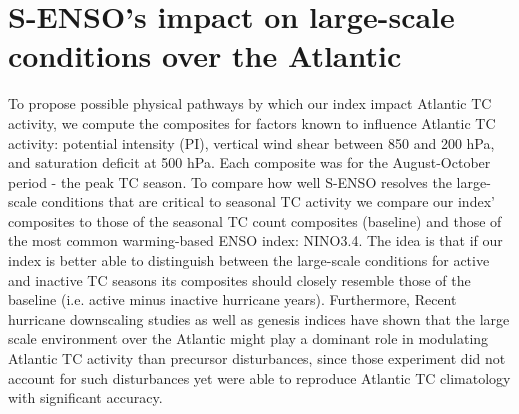 \section{S-ENSO's impact on large-scale conditions over the Atlantic}
To propose possible physical pathways by which our index impact Atlantic TC activity, we compute the composites for factors known to influence Atlantic TC activity: potential intensity (PI), vertical wind shear between 850 and 200 hPa, and saturation deficit at 500 hPa. Each composite was for the August-October period - the peak TC season. To compare how well S-ENSO resolves the large-scale conditions that are critical to seasonal TC activity we compare our index' composites to those of the seasonal TC count composites (baseline) and those of the most common warming-based ENSO index: NINO3.4. The idea is that if our index is better able to distinguish between the large-scale conditions for active and inactive TC seasons its composites should closely resemble those of the baseline (i.e. active minus inactive hurricane years). Furthermore, Recent hurricane downscaling studies \cite{knutson2007simulation, emanuel2010comparison} as well as genesis indices \cite{menkes2012comparison} have shown that the large scale environment over the Atlantic might play a dominant role in modulating Atlantic TC activity than precursor disturbances, since those experiment did not account for such disturbances yet were able to reproduce Atlantic TC climatology with significant accuracy.


